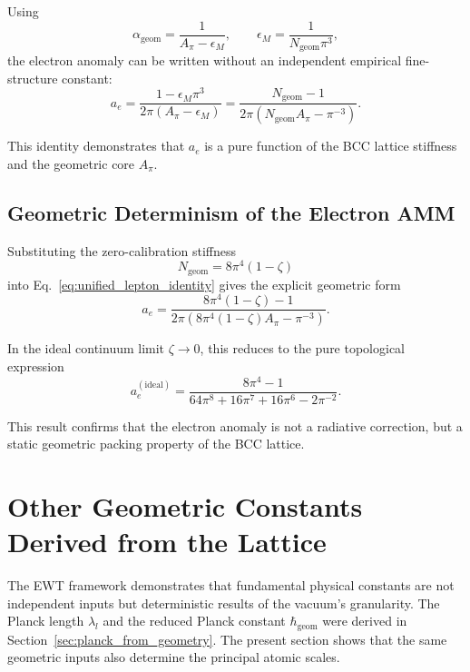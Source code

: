 \documentclass[10pt,a4paper]{article}
\begin{document}
Using
\[
\alpha_{\text{geom}} = \frac{1}{A_\pi - \epsilon_M},
\qquad
\epsilon_M = \frac{1}{N_{\text{geom}}\pi^3},
\]
the electron anomaly can be written without an independent empirical
fine-structure constant:
\begin{equation}
	a_e
	=
	\frac{1 - \epsilon_M \pi^3}{2\pi (A_\pi - \epsilon_M)}
	=
	\frac{N_{\text{geom}} - 1}{2\pi(N_{\text{geom}} A_\pi - \pi^{-3})}.
	\label{eq:unified_lepton_identity}
\end{equation}

This identity demonstrates that \(a_e\) is a pure function of the BCC lattice
stiffness and the geometric core \(A_\pi\).

\subsection{Geometric Determinism of the Electron AMM}
\label{sec:geometric_amm_determinism}

Substituting the zero-calibration stiffness
\[
N_{\text{geom}} = 8\pi^4(1-\zeta)
\]
into Eq.~\eqref{eq:unified_lepton_identity} gives the explicit geometric form
\begin{equation}
	a_e
	=
	\frac{8\pi^4(1-\zeta) - 1}
	{2\pi\left(8\pi^4(1-\zeta) A_\pi - \pi^{-3}\right)} .
	\label{eq:ae_pure_geometric_final}
\end{equation}

In the ideal continuum limit \(\zeta\to 0\), this reduces to the pure
topological expression
\begin{equation}
	a_e^{(\text{ideal})}
	=
	\frac{8\pi^4 - 1}
	{64\pi^8 + 16\pi^7 + 16\pi^6 - 2\pi^{-2}} .
\end{equation}

This result confirms that the electron anomaly is not a radiative correction,
but a static geometric packing property of the BCC lattice.

\section{Other Geometric Constants Derived from the Lattice}

The EWT framework demonstrates that fundamental physical constants are not independent inputs but deterministic results of the vacuum's granularity. The Planck length \(\lambda_l\) and the reduced Planck constant \(\hbar_{\text{geom}}\) were derived in Section~\ref{sec:planck_from_geometry}. The present section shows that the same geometric inputs also determine the principal atomic scales.
\end{document}

